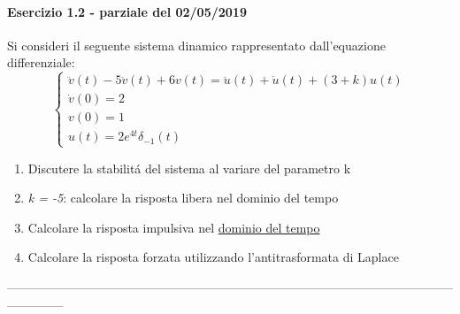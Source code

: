 \documentclass[12pt,a4paper]{article}
\begin{document}
	\paragraph*{Esercizio 1.2 - parziale del 02/05/2019}
	Si consideri il seguente sistema dinamico rappresentato dall'equazione differenziale:
	\[
		\begin{cases}
			\ddot{v}(t) -5\ddot{v}(t) + 6v(t) = \ddot{u}(t) + \dot{u}(t) + (3+k)u(t)\\
			\dot{v}(0) = 2\\
			v(0) = 1\\
			u(t) = 2e^{4t}\delta_{-1}(t)
		\end{cases}
	\]
	\begin{enumerate}
		\item Discutere la stabilit\'a del sistema al variare del parametro k
		\item \textit{k = -5}: calcolare la risposta libera nel dominio del tempo
		\item Calcolare la risposta impulsiva nel \underline{dominio del tempo}
		\item Calcolare la risposta forzata utilizzando l'antitrasformata di Laplace
	\end{enumerate}
--------------------------------------------------------------------------------------------------------------------------\\
\end{document}
